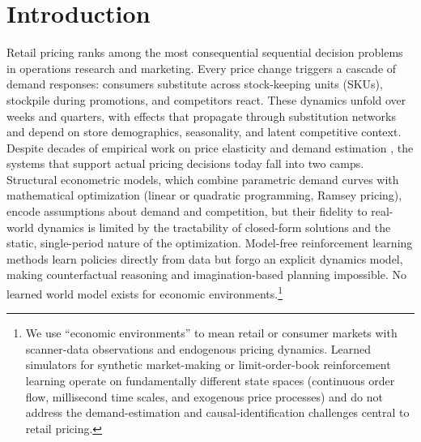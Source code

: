 \section{Introduction}
\label{sec:introduction}

Retail pricing ranks among the most consequential sequential decision problems in operations research and marketing. Every price change triggers a cascade of demand responses: consumers substitute across stock-keeping units (SKUs), stockpile during promotions, and competitors react. These dynamics unfold over weeks and quarters, with effects that propagate through substitution networks and depend on store demographics, seasonality, and latent competitive context. Despite decades of empirical work on price elasticity and demand estimation \citep{hoch1995determinants, nevo2001measuring, montgomery1997estimating}, the systems that support actual pricing decisions today fall into two camps. Structural econometric models, which combine parametric demand curves with mathematical optimization (linear or quadratic programming, Ramsey pricing), encode assumptions about demand and competition, but their fidelity to real-world dynamics is limited by the tractability of closed-form solutions and the static, single-period nature of the optimization. Model-free reinforcement learning methods \citep{chen2022dynamic, ban2021personalized} learn policies directly from data but forgo an explicit dynamics model, making counterfactual reasoning and imagination-based planning impossible. No learned world model exists for economic environments.\footnote{We use ``economic environments'' to mean retail or consumer markets with scanner-data observations and endogenous pricing dynamics. Learned simulators for synthetic market-making or limit-order-book reinforcement learning operate on fundamentally different state spaces (continuous order flow, millisecond time scales, and exogenous price processes) and do not address the demand-estimation and causal-identification challenges central to retail pricing.}

